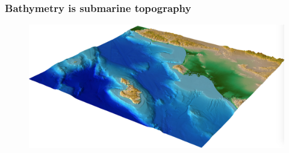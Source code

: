 \documentclass[7pt]{beamer}
\begin{document}
\begin{frame}
	\frametitle{Bathymetry is submarine topography}
		\begin{figure}[h]
			\includegraphics[width=1.\linewidth]{img/bath_topo_example.png}\hfill
		\end{figure}
\end{frame}
\end{document}

